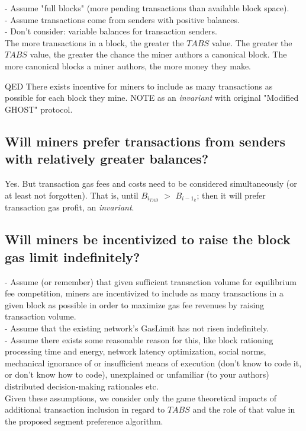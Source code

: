 \documentclass[11pt]{article}
\theoremstyle{plain}
\begin{document}
- Assume "full blocks" (more pending transactions than available block space).
\\
- Assume transactions come from senders with positive balances. \\
- Don't consider: variable balances for transaction senders. \\

The more transactions in a block, the greater the $TABS$ value.
The greater the $TABS$ value, the greater the chance the miner authors a
canonical block.
The more canonical blocks a miner authors, the more money they make.

QED There exists incentive for miners to include as many transactions as
possible for each block they mine.
NOTE as an \textit{invariant} with original "Modified GHOST" protocol.

\subsection{\small{Will miners prefer transactions from senders with relatively
greater balances?}}

Yes. But transaction gas fees and costs need to be considered simultaneously
(or at least not forgotten).
That is, until $B_{i}_{TAB}$ $>$ $B_{i-1}_{k}$; then it will prefer transaction
gas profit, an \textit{invariant}.

\subsection{\small{Will miners be incentivized to raise the block gas limit
indefinitely?}}

- Assume (or remember) that given sufficient transaction volume for equilibrium
fee competition, miners
  are incentivized to include as many transactions in a given block as possible
in order to maximize
  gas fee revenues by raising transaction volume. \\
- Assume that the existing network's GasLimit has not risen indefinitely. \\
- Assume there exists some reasonable reason for this, like block rationing
processing time and energy,
  network latency optimization, social norms, mechanical ignorance of or
insufficient means of execution (don't know to code it, or don't know how to
code),
  unexplained or unfamiliar (to your authors) distributed decision-making
rationales etc. \\

Given these assumptions, we consider only the game theoretical impacts of
additional transaction inclusion
in regard to $TABS$ and the role of that value in the proposed segment
preference algorithm.
\end{document}

